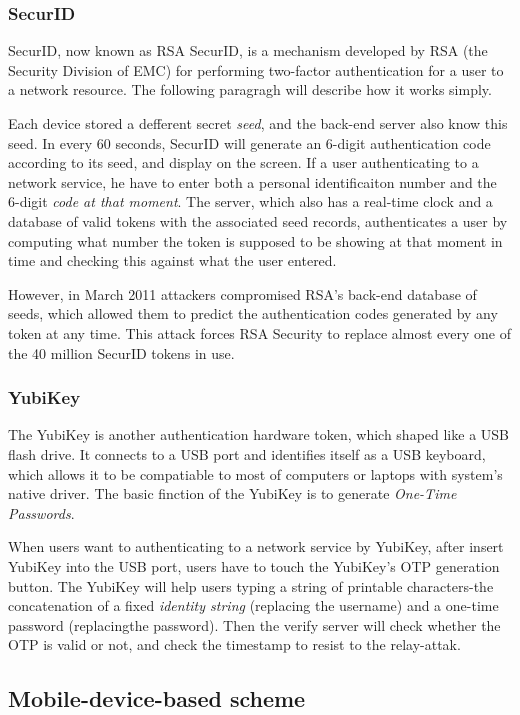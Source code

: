 \begin{CJK}{Bg5}{bsmi}
\subsubsection{SecurID}

SecurID, now known as RSA SecurID, is a mechanism developed by RSA (the Security Division of EMC) for performing two-factor authentication for a user to a network resource. The following paragragh will describe how it works simply.

Each device stored a defferent secret \emph{seed}, and the back-end server also know this seed. In every 60 seconds, SecurID will generate an 6-digit authentication code according to its seed, and display on the screen. If a user authenticating to a network service, he have to enter both a personal identificaiton number and the 6-digit \emph{code at that moment}. The server, which also has a real-time clock and a database of valid tokens with the associated seed records, authenticates a user by computing what number the token is supposed to be showing at that moment in time and checking this against what the user entered.

However, in March 2011 attackers compromised RSA's back-end database of seeds, which allowed them to predict the authentication codes generated by any token at any time. This attack forces RSA Security to replace almost every one of the 40 million SecurID tokens in use.

\subsubsection{YubiKey}

The YubiKey is another authentication hardware token, which shaped like a USB flash drive. It connects to a USB port and identifies itself as a USB keyboard, which allows it to be compatiable to most of computers or laptops with system's native driver. The basic finction of the YubiKey is to generate \emph{One-Time Passwords}. 

When users want to authenticating to a network service by YubiKey, after insert YubiKey into the USB port, users have to touch the YubiKey's OTP generation button. The YubiKey will help users typing a string of printable characters-the concatenation of a fixed \emph{identity string} (replacing the username) and a one-time password (replacingthe password). Then the verify server will check whether the OTP is valid or not, and check the timestamp to resist to the relay-attak.

\subsection{Mobile-device-based scheme}


\end{CJK}
